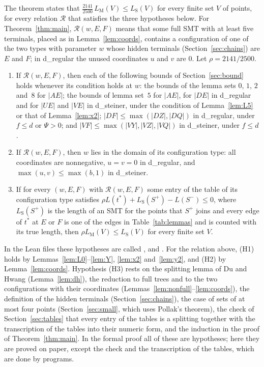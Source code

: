 \documentclass[11pt]{amsart}
\theoremstyle{definition}
\theoremstyle{remark}
\numberwithin{equation}{section}
\newcommand{\lean}[1]{\texttt{\detokenize{#1}}}
\newcommand{\LS}{L_{\mathrm S}}
\newcommand{\LM}{L_{\mathrm M}}
\newcommand{\RHO}{\tfrac{2141}{2500}}
\begin{document}
The theorem \lean{S43.Final.steiner_ratio_ge} states that $\RHO\,\LM(V)\le\LS(V)$ for every finite set $V$ of points, for every relation $\mathcal R$ that satisfies the three hypotheses below. For Theorem~\ref{thm:main}, $\mathcal R(w,E,F)$ means that some full SMT with at least five terminals, placed as in Lemma~\ref{lem:coords}, contains a configuration of one of the two types with parameter $w$ whose hidden terminals (Section~\ref{sec:chains}) are $E$ and $F$; in d\_regular the unused coordinates $u$ and $v$ are $0$. Let $\rho=2141/2500$.
\begin{enumerate}[label=(H\arabic*),leftmargin=*]
\item If $\mathcal R(w,E,F)$, then each of the following bounds of Section~\ref{sec:bound} holds whenever its condition holds at $w$: the bounds of the lemma sets $0$, $1$, $2$ and~$8$ for $|AE|$; the bounds of lemma set~$5$ for $|AE|$, for $|DE|$ in d\_regular and for $|UE|$ and $|VE|$ in d\_steiner, under the condition of Lemma~\ref{lem:L5} or that of Lemma~\ref{lem:x2}; $|DF|\le\max(|DZ|,|DQ|)$ in d\_regular, under $f\le d$ or $\Psi>0$; and $|VF|\le\max(|VY|,|VZ|,|VQ|)$ in d\_steiner, under $f\le d$.
\item If $\mathcal R(w,E,F)$, then $w$ lies in the domain of its configuration type: all coordinates are nonnegative, $u=v=0$ in d\_regular, and $\max(u,v)\le\max(b,1)$ in d\_steiner.
\item If for every $(w,E,F)$ with $\mathcal R(w,E,F)$ some entry of the table of its configuration type satisfies $\rho L(t^*)+\LS(S^+)-L(S^-)\le0$, where $\LS(S^+)$ is the length of an SMT for the points that $S^+$ joins and every edge of $t^*$ at $E$ or $F$ is one of the edges in Table~\ref{tab:lemmas} and is counted with its true length, then $\rho\LM(V)\le\LS(V)$ for every finite set $V$.
\end{enumerate}
In the Lean files these hypotheses are called \lean{HTrap}, \lean{HDomain} and \lean{HDuHwang}. For the relation above, (H1) holds by Lemmas~\ref{lem:L0}--\ref{lem:Y}, \ref{lem:x2} and~\ref{lem:y2}, and (H2) by Lemma~\ref{lem:coords}. Hypothesis (H3) rests on the splitting lemma of Du and Hwang (Lemma~\ref{lem:dh}), the reduction to full trees and to the two configurations with their coordinates (Lemmas~\ref{lem:nonfull}--\ref{lem:coords}), the definition of the hidden terminals (Section~\ref{sec:chains}), the case of sets of at most four points (Section~\ref{sec:small}, which uses Pollak's theorem), the check of Section~\ref{sec:tables} that every entry of the tables is a splitting together with the transcription of the tables into their numeric form, and the induction in the proof of Theorem~\ref{thm:main}. In the formal proof all of these are hypotheses; here they are proved on paper, except the check and the transcription of the tables, which are done by programs.
\end{document}

